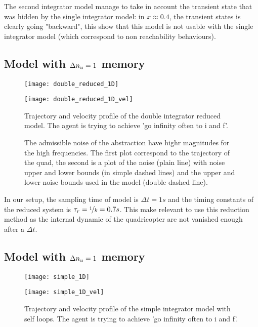 
The second integrator model manage to take in account the transient state that was hidden by the single integrator model: in $x\approx0.4$, the transient states is clearly going "backward", this show that this model is not usable with the single integrator model (which correspond to non reachability behaviours).

\subsection{Model with $\Delta n_u= 1$ memory}
\begin{figure}[!ht]
	\begin{minipage}[b]{0.5\textwidth}
  		\centering
  		\texttt{[image: double\_reduced\_1D]}
	  	\label{double_reduced_1D}
  \end{minipage}
	\begin{minipage}[b]{0.5\textwidth}
  		\centering
  		\texttt{[image: double\_reduced\_1D\_vel]}
	  	\label{double_reduced_1D_vel}
  \end{minipage}
  \caption{Trajectory and velocity profile of the double integrator reduced model. The agent is trying to achieve 'go infinity often to i and f'.}
\end{figure}

\begin{figure}[!ht]
  	\centering
	
  	\label{double_reduced_1D_noise}
  	\caption{The admissible noise of the abstraction have highr magnitudes for the high frequencies. The first plot correspond to the trajectory of the quad, the second is a plot of the noise (plain line) with noise upper and lower bounds (in simple dashed lines) and the upper and lower noise bounds used in the model (double dashed line).}
\end{figure}


In our setup, the sampling time of model is ${\Delta t = 1s}$ and the timing constants of the reduced system is $\tau_r = {\nicefrac{1}{k} = 0.7s}$. This make relevant to use this reduction method as the internal dynamic of the quadricopter are not vanished enough after a $\Delta t$.


\subsection{Model with $\Delta n_u= 1$ memory} \label{sec:single_int}
\begin{figure}[!ht]
	\begin{minipage}[b]{0.5\textwidth}
  		\centering
  		\texttt{[image: simple\_1D]}
	  	\label{simple_1D}
  \end{minipage}
	\begin{minipage}[b]{0.5\textwidth}
  		\centering
  		\texttt{[image: simple\_1D\_vel]}
	  	\label{simple_1D_vel}
  \end{minipage}
  \caption{Trajectory and velocity profile of the simple integrator model with self loops. The agent is trying to achieve 'go infinity often to i and f'.}
\end{figure}

